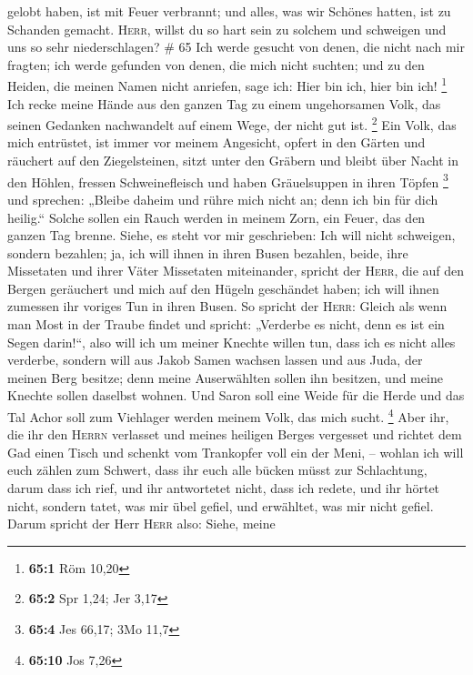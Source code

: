 gelobt haben, ist mit Feuer verbrannt; und alles, was wir Schönes
hatten, ist zu Schanden gemacht.  \textsc{Herr}, willst
du so hart sein zu solchem und schweigen und uns so sehr niederschlagen?
\# 65  Ich werde gesucht von denen, die nicht nach mir
fragten; ich werde gefunden von denen, die mich nicht suchten; und zu
den Heiden, die meinen Namen nicht anriefen, sage ich: Hier bin ich,
hier bin ich! \footnote{\textbf{65:1} Röm 10,20}  Ich
recke meine Hände aus den ganzen Tag zu einem ungehorsamen Volk, das
seinen Gedanken nachwandelt auf einem Wege, der nicht gut ist.
\footnote{\textbf{65:2} Spr 1,24; Jer 3,17}  Ein Volk, das
mich entrüstet, ist immer vor meinem Angesicht, opfert in den Gärten und
räuchert auf den Ziegelsteinen,  sitzt unter den Gräbern
und bleibt über Nacht in den Höhlen, fressen Schweinefleisch und haben
Gräuelsuppen in ihren Töpfen \footnote{\textbf{65:4} Jes 66,17; 3Mo 11,7}
 und sprechen: „Bleibe daheim und rühre mich nicht an;
denn ich bin für dich heilig.`` Solche sollen ein Rauch werden in meinem
Zorn, ein Feuer, das den ganzen Tag brenne.  Siehe, es
steht vor mir geschrieben: Ich will nicht schweigen, sondern bezahlen;
ja, ich will ihnen in ihren Busen bezahlen,  beide, ihre
Missetaten und ihrer Väter Missetaten miteinander, spricht der
\textsc{Herr}, die auf den Bergen geräuchert und mich auf den Hügeln
geschändet haben; ich will ihnen zumessen ihr voriges Tun in ihren
Busen.  So spricht der \textsc{Herr}: Gleich als wenn man
Most in der Traube findet und spricht: „Verderbe es nicht, denn es ist
ein Segen darin!{}``, also will ich um meiner Knechte willen tun, dass
ich es nicht alles verderbe,  sondern will aus Jakob Samen
wachsen lassen und aus Juda, der meinen Berg besitze; denn meine
Auserwählten sollen ihn besitzen, und meine Knechte sollen daselbst
wohnen.  Und Saron soll eine Weide für die Herde und das
Tal Achor soll zum Viehlager werden meinem Volk, das mich sucht.
\footnote{\textbf{65:10} Jos 7,26}  Aber ihr, die ihr den
\textsc{Herrn} verlasset und meines heiligen Berges vergesset und
richtet dem Gad einen Tisch und schenkt vom Trankopfer voll ein der
Meni, --  wohlan ich will euch zählen zum Schwert, dass
ihr euch alle bücken müsst zur Schlachtung, darum dass ich rief, und ihr
antwortetet nicht, dass ich redete, und ihr hörtet nicht, sondern tatet,
was mir übel gefiel, und erwähltet, was mir nicht gefiel.
 Darum spricht der Herr \textsc{Herr} also: Siehe, meine
